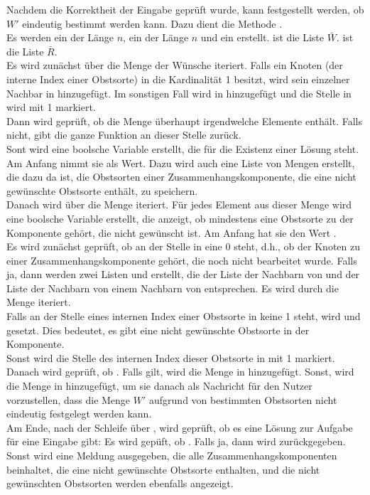 Nachdem die Korrektheit der Eingabe geprüft wurde, kann festgestellt werden, ob $W'$ eindeutig
bestimmt werden kann. Dazu dient die Methode .\\
Es werden ein  der Länge $n$, ein  der Länge $n$ und 
ein  erstellt.
 ist die Liste $\bar{W}$.  ist die Liste $\bar{R}$.\\
Es wird zunächst über die Menge der Wünsche  iteriert. 
Falls ein Knoten  (der interne Index einer Obstsorte) in 
die Kardinalität 1 besitzt, wird sein einzelner
Nachbar in  hinzugefügt.
Im sonstigen Fall wird  in  hinzugefügt und die Stelle  in 
wird mit 1 markiert.\\
Dann wird geprüft, ob die Menge  überhaupt irgendwelche Elemente enthält.
Falls nicht, gibt die ganze Funktion an dieser Stelle  zurück.\\
Sont wird eine boolsche Variable  erstellt, die für die Existenz einer Lösung steht.
Am Anfang nimmt sie  als Wert. 
Dazu wird auch eine Liste von Mengen  erstellt, die dazu da ist,
die Obstsorten einer Zusammenhangskomponente, die eine nicht gewünschte Obstsorte enthält, zu speichern.\\
Danach wird über die Menge  iteriert. 
Für jedes Element  aus dieser Menge wird eine boolsche Variable  erstellt, die 
anzeigt, ob mindestens eine Obstsorte zu der Komponente gehört, die nicht gewünscht ist.
Am Anfang hat sie den Wert .\\
Es wird zunächst geprüft, ob an der Stelle  in  eine 0 steht, d.h.,
ob der Knoten zu einer Zusammenhangskomponente gehört, die noch nicht bearbeitet wurde.
Falls ja, dann werden zwei Listen  und  erstellt,
die der Liste der Nachbarn von  und der Liste der Nachbarn von einem Nachbarn von 
entsprechen.
Es wird durch die Menge  iteriert.\\
Falls an der Stelle eines internen Index
einer Obstsorte in  keine 1 steht, wird  und  gesetzt.
Dies bedeutet, es gibt eine nicht gewünschte Obstsorte in der Komponente.\\
Sonst wird die Stelle des internen Index dieser Obstsorte in  mit 1 markiert.\\
Danach wird geprüft, ob . Falls  gilt, wird die Menge 
in  hinzugefügt. Sonst, wird die Menge  in  hinzugefügt, um sie 
danach als Nachricht für den Nutzer vorzustellen, dass 
die Menge $W'$ aufgrund von bestimmten Obstsorten nicht eindeutig festgelegt werden kann.\\
Am Ende, nach der Schleife über , wird geprüft, ob es eine Lösung zur Aufgabe für eine
Eingabe gibt: Es wird gepüft, ob . Falls ja, dann wird  zurückgegeben.
Sonst wird eine Meldung ausgegeben, die alle Zusammenhangskomponenten beinhaltet, 
die eine nicht gewünschte Obstsorte enthalten, und die nicht gewünschten Obstsorten werden
ebenfalls angezeigt.
